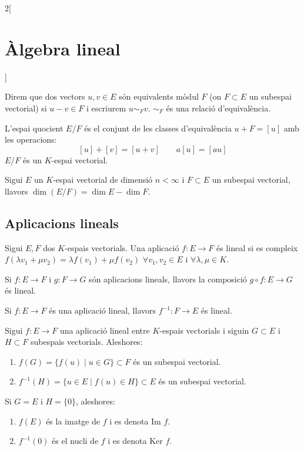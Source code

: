 \documentclass[class=article,10pt,crop=false]{standalone}
\begin{document}
\begin{multicols}{2}[\section{Àlgebra lineal}]
\begin{definition}
\end{definition}
\begin{definition}
Direm que dos vectors $u,v\in E$ són equivalents mòdul $F$ (on $F\subset E$ un subespai vectorial) si $u-v\in F$ i escriurem $u\sim_Fv$. $\sim_F$ és una relació d'equivalència.
\end{definition}
\begin{definition}
L'espai quocient $E/F$ és el conjunt de les classes d'equivalència $u+F=[u]$ amb les operacions:
$$[u]+[v]=[u+v]\qquad a[u]=[au]$$ $E/F$ és un $K$-espai vectorial.
\end{definition}
\begin{prop}
Sigui $E$ un $K$-espai vectorial de dimensió $n<\infty$ i $F\subset E$ un subespai vectorial, llavors $\dim (E/F)=\dim E-\dim F$.
\end{prop}
\subsection{Aplicacions lineals}
\begin{definition}
Sigui $E,F$ dos $K$-espais vectorials. Una aplicació $f:E\rightarrow F$ és lineal si es compleix $f(\lambda v_1+\mu v_2)=\lambda f(v_1)+\mu f(v_2)$ $\forall v_1,v_2\in E$ i $\forall\lambda,\mu\in K$.
\end{definition}
\begin{prop}
Si $f:E\rightarrow F$ i $g:F\rightarrow G$ són aplicacions lineals, llavors la composició $g\circ f:E\rightarrow G$ és lineal.
\end{prop}
\begin{prop}
Si $f:E\rightarrow F$ és una aplicació lineal, llavors $f^{-1}:F\rightarrow E$ és lineal.
\end{prop}
\begin{prop}
Sigui $f:E\rightarrow F$ una aplicació lineal entre $K$-espais vectorials i siguin $G\subset E$ i $H\subset F$ subespais vectorials. Aleshores:
\begin{enumerate}
    \item $f(G)=\{f(u)\mid u\in G\}\subset F$ és un subespai vectorial.
    \item $f^{-1}(H)=\{u\in E\mid f(u)\in H\}\subset E$ és un subespai vectorial.
\end{enumerate}
Si $G=E$ i $H=\{0\}$, aleshores:
\begin{enumerate}
    \item $f(E)$ és la imatge de $f$ i es denota $\text{Im }f$.
    \item $f^{-1}(0)$ és el nucli de $f$ i es denota $\text{Ker }f$.

\end{enumerate}
\end{prop}
\end{multicols}
\end{document}
